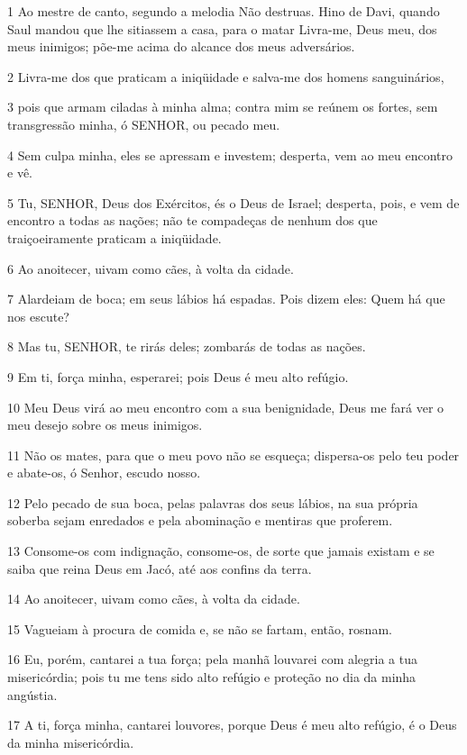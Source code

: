 \par 1 Ao mestre de canto, segundo a melodia Não destruas. Hino de Davi, quando Saul mandou que lhe sitiassem a casa, para o matar Livra-me, Deus meu, dos meus inimigos; põe-me acima do alcance dos meus adversários.
\par 2 Livra-me dos que praticam a iniqüidade e salva-me dos homens sanguinários,
\par 3 pois que armam ciladas à minha alma; contra mim se reúnem os fortes, sem transgressão minha, ó SENHOR, ou pecado meu.
\par 4 Sem culpa minha, eles se apressam e investem; desperta, vem ao meu encontro e vê.
\par 5 Tu, SENHOR, Deus dos Exércitos, és o Deus de Israel; desperta, pois, e vem de encontro a todas as nações; não te compadeças de nenhum dos que traiçoeiramente praticam a iniqüidade.
\par 6 Ao anoitecer, uivam como cães, à volta da cidade.
\par 7 Alardeiam de boca; em seus lábios há espadas. Pois dizem eles: Quem há que nos escute?
\par 8 Mas tu, SENHOR, te rirás deles; zombarás de todas as nações.
\par 9 Em ti, força minha, esperarei; pois Deus é meu alto refúgio.
\par 10 Meu Deus virá ao meu encontro com a sua benignidade, Deus me fará ver o meu desejo sobre os meus inimigos.
\par 11 Não os mates, para que o meu povo não se esqueça; dispersa-os pelo teu poder e abate-os, ó Senhor, escudo nosso.
\par 12 Pelo pecado de sua boca, pelas palavras dos seus lábios, na sua própria soberba sejam enredados e pela abominação e mentiras que proferem.
\par 13 Consome-os com indignação, consome-os, de sorte que jamais existam e se saiba que reina Deus em Jacó, até aos confins da terra.
\par 14 Ao anoitecer, uivam como cães, à volta da cidade.
\par 15 Vagueiam à procura de comida e, se não se fartam, então, rosnam.
\par 16 Eu, porém, cantarei a tua força; pela manhã louvarei com alegria a tua misericórdia; pois tu me tens sido alto refúgio e proteção no dia da minha angústia.
\par 17 A ti, força minha, cantarei louvores, porque Deus é meu alto refúgio, é o Deus da minha misericórdia.

